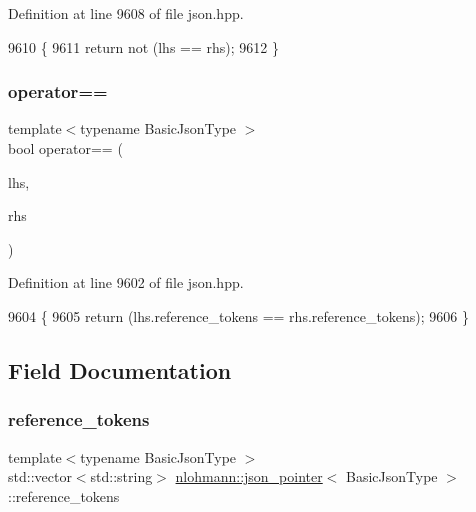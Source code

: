 Definition at line 9608 of file json.\+hpp.


\begin{DoxyCode}
9610     \{
9611         \textcolor{keywordflow}{return} not (lhs == rhs);
9612     \}
\end{DoxyCode}
\mbox{\label{classnlohmann_1_1json__pointer_a4667ef558c8c3f8a646bfda0c6654653}} 
\subsubsection{\texorpdfstring{operator==}{operator==}}
{\footnotesize\ttfamily template$<$typename Basic\+Json\+Type $>$ \\
bool operator== (\begin{DoxyParamCaption}\item[{\hyperlink{classnlohmann_1_1json__pointer}{json\+\_\+pointer}$<$ Basic\+Json\+Type $>$ const \&}]{lhs,  }\item[{\hyperlink{classnlohmann_1_1json__pointer}{json\+\_\+pointer}$<$ Basic\+Json\+Type $>$ const \&}]{rhs }\end{DoxyParamCaption})\hspace{0.3cm}{\ttfamily [friend]}}



Definition at line 9602 of file json.\+hpp.


\begin{DoxyCode}
9604     \{
9605         \textcolor{keywordflow}{return} (lhs.reference\_tokens == rhs.reference\_tokens);
9606     \}
\end{DoxyCode}


\subsection{Field Documentation}
\mbox{\label{classnlohmann_1_1json__pointer_a07a990a6838de4f38ee9d881e7b9fd61}} 
\subsubsection{\texorpdfstring{reference\+\_\+tokens}{reference\_tokens}}
{\footnotesize\ttfamily template$<$typename Basic\+Json\+Type $>$ \\
std\+::vector$<$std\+::string$>$ \hyperlink{classnlohmann_1_1json__pointer}{nlohmann\+::json\+\_\+pointer}$<$ Basic\+Json\+Type $>$\+::reference\+\_\+tokens\hspace{0.3cm}{\ttfamily [private]}}



